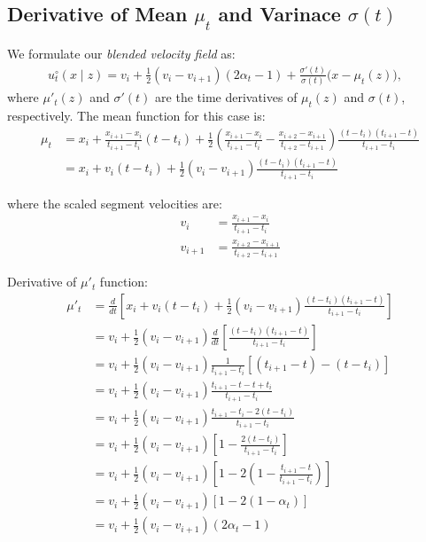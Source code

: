 \documentclass[twoside]{article}
\begin{document}
\subsection{Derivative of Mean $\mu_t$ and Varinace $\sigma(t)$} \label{mu_sigma_prime}
We formulate our \emph{blended velocity field} as:
\begin{align}
& u^\circ_t(x \mid z)
   =v_i + \frac{1}{2}(v_i - v_{i+1})(2\alpha_t - 1) + \frac{\sigma'(t)}{\sigma(t)}\bigl(x - \mu_t(z)\bigr) , &&
\label{app:blended-drift}
\end{align}
where $\mu'_t(z)$ and $\sigma'(t)$ are the time derivatives of $\mu_t(z)$ and $\sigma(t)$, respectively.
The mean function for this case is:
\begin{align}
\mu_t &= x_i + \frac{x_{i+1} - x_i}{t_{i+1} - t_i}(t - t_i) + \frac{1}{2}\left(\frac{x_{i+1} - x_i}{t_{i+1} - t_i} - \frac{x_{i+2} - x_{i+1}}{t_{i+2} - t_{i+1}}\right)\frac{(t - t_i)(t_{i+1} - t)}{t_{i+1} - t_i} \\
&= x_i + v_i(t - t_i) + \frac{1}{2}(v_i - v_{i+1})\frac{(t - t_i)(t_{i+1} - t)}{t_{i+1} - t_i}
\end{align}

where the scaled segment velocities are:
\begin{align}
v_i &= \frac{x_{i+1} - x_i}{t_{i+1} - t_i} \\
v_{i+1} &= \frac{x_{i+2} - x_{i+1}}{t_{i+2} - t_{i+1}}
\end{align}

Derivative of $\mu'_t$ function:
\begin{align}
\mu'_t &= \frac{d}{dt}\left[x_i + v_i(t - t_i) + \frac{1}{2}(v_i - v_{i+1})\frac{(t - t_i)(t_{i+1} - t)}{t_{i+1} - t_i}\right] \\
&= v_i + \frac{1}{2}(v_i - v_{i+1})\frac{d}{dt}\left[\frac{(t - t_i)(t_{i+1} - t)}{t_{i+1} - t_i}\right] \\
&= v_i + \frac{1}{2}(v_i - v_{i+1})\frac{1}{t_{i+1} - t_i}\left[(t_{i+1} - t) - (t - t_i)\right] \\
&= v_i + \frac{1}{2}(v_i - v_{i+1})\frac{t_{i+1} - t - t + t_i}{t_{i+1} - t_i} \\
&= v_i + \frac{1}{2}(v_i - v_{i+1})\frac{t_{i+1} - t_i - 2(t - t_i)}{t_{i+1} - t_i} \\
&= v_i + \frac{1}{2}(v_i - v_{i+1})\left[1 - \frac{2(t - t_i)}{t_{i+1} - t_i}\right] \\
&= v_i + \frac{1}{2}(v_i - v_{i+1})\left[1 - 2\left(1-\frac{t_{i+1} - t}{t_{i+1} - t_i}\right)\right] \\
&= v_i + \frac{1}{2}(v_i - v_{i+1})\left[1 - 2(1-\alpha_t)\right] \\
&= v_i + \frac{1}{2}(v_i - v_{i+1})(2\alpha_t - 1) \\
\end{align}
\end{document}
